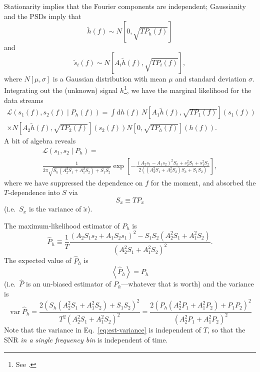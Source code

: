 \documentclass[modern]{aastex63}
\DeclareMathOperator{\var}{var}
\newcommand{\dd}{\mathrm{d}}
\begin{document}
Stationarity implies that the Fourier components are independent; Gaussianity
and the \acp{PSD} imply that
%
\begin{equation}
  \tilde{h}(f) \sim N\left[0, \sqrt{T P_h(f)} \right]
\end{equation}
%
and
%
\begin{equation}
  \tilde{s}_i(f) \sim N\left[ A_i \tilde{h}(f), \sqrt{T P_i(f)} \right],
\end{equation}
%
where $N[\mu, \sigma]$ is a Gaussian distribution with mean $\mu$ and standard
deviation $\sigma$.  Integrating out the (unknown) signal $h$\footnote{See
\citet{Cornish2013}.}, we have the marginal likelihood for the data streams
%
\begin{multline}
  \mathcal{L} \left( s_1(f), s_2(f) \mid P_h(f) \right) = \int \dd h(f) \, N\left[ A_1 \tilde{h}(f), \sqrt{T P_1(f)} \right]\left( s_1(f) \right) \\ \times N\left[ A_2 \tilde{h}(f), \sqrt{T P_2(f)} \right]\left( s_2(f) \right) N\left[0, \sqrt{T P_h(f)} \right]\left( h(f) \right).
\end{multline}
A bit of algebra reveals
%
\begin{multline}
  \mathcal{L} \left( s_1, s_2 \mid P_h \right) = \\ \frac{1}{2\pi \sqrt{S_h \left( A_2^2 S_1 + A_1^2 S_2 \right) + S_1 S_2}} \exp\left[ - \frac{\left(A_2 s_1 - A_1 s_2\right)^2 S_h + s_2^2 S_1 + s_1^2 S_2}{2 \left(\left(A_2^2 S_1 + A_1^2 S_2 \right)S_h + S_1 S_2 \right)}\right],
\end{multline}
%
where we have suppressed the dependence on $f$ for the moment, and absorbed the
$T$-dependence into $S$ via
%
\begin{equation}
  S_x \equiv T P_x
\end{equation}
%
(i.e.\ $S_x$ is the variance of $\tilde{x}$).

The maximum-likelihood estimator of $P_h$ is
%
\begin{equation}
  \label{eq:ml-est}
 \hat{P}_h \equiv \frac{1}{T} \frac{\left( A_2 S_1 s_2 + A_1 S_2 s_1 \right)^2 - S_1 S_2 \left( A_2^2 S_1 + A_1^2 S_2 \right)}{\left( A_2^2 S_1 + A_1^2 S_2 \right)^2}.
\end{equation}
%
The expected value of $\hat{P}_h$ is
%
\begin{equation}
  \left\langle \hat{P}_h \right\rangle = P_h
\end{equation}
%
(i.e.\ $\hat{P}$ is an un-biased estimator of $P_h$---whatever that is worth)
and the variance is
%
\begin{equation}
  \label{eq:est-variance}
  \var \hat{P}_h = \frac{2 \left( S_h \left(A_2^2 S_1 + A_1^2 S_2 \right) + S_1 S_2 \right)^2}{T^2 \left( A_2^2 S_1 + A_1^2 S_2 \right)^2} = \frac{2 \left( P_h \left(A_2^2 P_1 + A_1^2 P_2 \right) + P_1 P_2 \right)^2}{\left( A_2^2 P_1 + A_1^2 P_2 \right)^2}
\end{equation}
%
Note that the variance in Eq.\ \eqref{eq:est-variance} is independent of $T$, so
that the \ac{SNR} \emph{in a single frequency bin} is independent of time.
\end{document}
